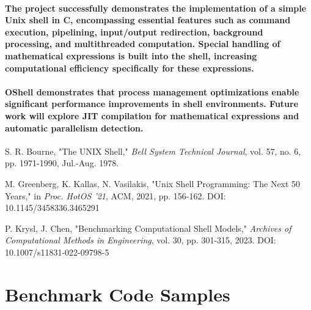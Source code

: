 \documentclass[10pt,twocolumn]{article}
\begin{document}
\paragraph{The project successfully demonstrates the implementation of a simple Unix shell in C, encompassing essential features such as command execution, pipelining, input/output redirection, background processing, and multithreaded computation. Special handling of mathematical expressions is built into the shell, increasing computational efficiency specifically for these expressions.}
\paragraph{OShell demonstrates that process management optimizations enable significant performance improvements in shell environments. Future work will explore JIT compilation for mathematical expressions and automatic parallelism detection.}


\begin{thebibliography}{10}

S. R. Bourne, 
"The UNIX Shell," 
\textit{Bell System Technical Journal}, 
vol. 57, no. 6, pp. 1971-1990, 
Jul.-Aug. 1978.

M. Greenberg, K. Kallas, N. Vasilakis, 
"Unix Shell Programming: The Next 50 Years," 
in \textit{Proc. HotOS '21}, 
ACM, 2021, pp. 156-162. 
DOI: 10.1145/3458336.3465291

P. Krysl, J. Chen, 
"Benchmarking Computational Shell Models," 
\textit{Archives of Computational Methods in Engineering}, 
vol. 30, pp. 301-315, 2023. 
DOI: 10.1007/s11831-022-09798-5

\end{thebibliography}

\appendix
\section*{Benchmark Code Samples}




\end{document}
